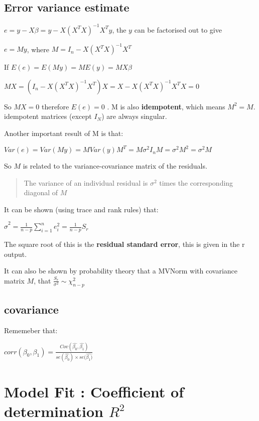\documentclass[
  letterpaper,
  DIV=11,
  numbers=noendperiod]{scrreprt}
\begin{document}
\hypertarget{error-variance-estimate}{%
\subsection{Error variance estimate}\label{error-variance-estimate}}

\(e = y-X\beta = y - X(X^TX)^{-1}X^Ty\), the \(y\) can be factorised out
to give

\(e = My\), where \(M = I_n - X(X^TX)^{-1}X^T\)

If \(E(e) = E(My) = ME(y) = MX\beta\)

\(MX = (I_n - X(X^TX)^{-1}X^T)X = X - X(X^TX)^{-1}X^TX = 0\)

So \(MX = 0\) therefore \(E(e) = 0\) . M is also \textbf{idempotent},
which means \(M^2 = M\). idempotent matrices (except \(I_N\)) are always
singular.

Another important result of M is that:

\(Var(e) = Var(My) = MVar(y)M^T = M\sigma^2I_nM =\sigma^2M^2 = \sigma^2M\)

So \(M\) is related to the variance-covariance matrix of the residuals.

\begin{quote}
The variance of an individual residual is \(\sigma^2\) times the
corresponding diagonal of \(M\)
\end{quote}

It can be shown (using trace and rank rules) that:

\(\hat{\sigma}^2 = \frac{1}{n-p}\sum^n_{i=1}e_i^2 = \frac{1}{n-p}S_r\)

The square root of this is the \textbf{residual standard error}, this is
given in the r output.

It can also be shown by probability theory that a MVNorm with covariance
matrix \(M\), that \(\frac{S_r}{\sigma^2} \sim \chi^2_{n-p}\)

\hypertarget{covariance}{%
\subsection{\texorpdfstring{\hat{\beta}
covariance}{ covariance}}\label{covariance}}

Rememeber that:

\(corr(\beta_0, \beta_1) = \frac{Cov(\hat{\beta_0},\hat{\beta_1})}{se(\hat{\beta_0}) \times se(\hat{\beta_1)}}\)

\hypertarget{model-fit-coefficient-of-determination-r2}{%
\section{\texorpdfstring{Model Fit : Coefficient of determination
\(R^2\)}{Model Fit : Coefficient of determination R\^{}2}}\label{model-fit-coefficient-of-determination-r2}}
\end{document}
